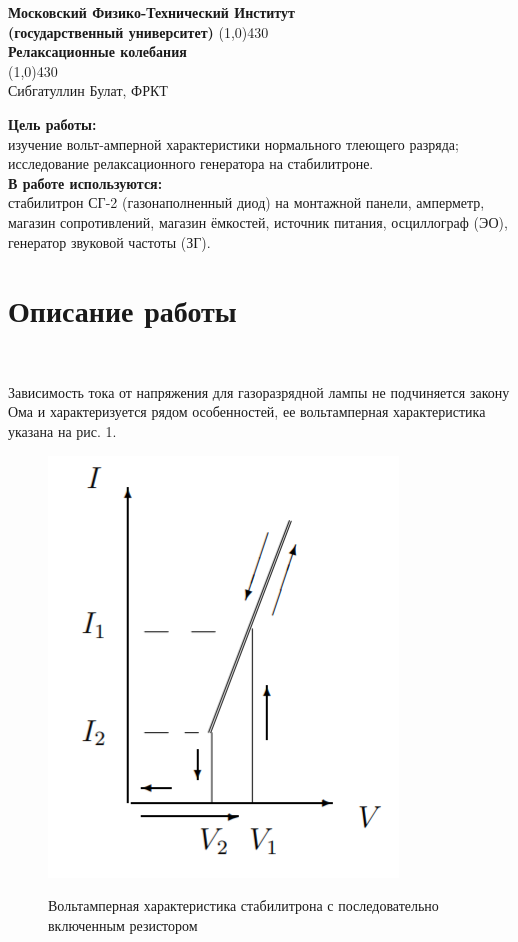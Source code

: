 \documentclass[11pt]{article}
\begin{document}
\begin{titlepage}

\begin{center}
\large\textbf{Московский Физико-Технический Институт}\\
\large\textbf{(государственный университет)}
\vfill
\line(1,0){430}\\[1mm]
\huge\textbf{Релаксационные колебания}\\
\line(1,0){430}\\[1mm]
\vfill
\large Сибгатуллин Булат, ФРКТ\\
\end{center}

\end{titlepage}
\noindent \textbf{Цель работы:} \\
\indent изучение вольт-амперной характеристики нормального тлеющего разряда; исследование релаксационного генератора на стабилитроне.\\
\noindent \textbf{В работе используются:} \\
\indent стабилитрон СГ-2 (газонаполненный диод) на монтажной панели, амперметр, магазин сопротивлений, магазин ёмкостей, источник питания, осциллограф (ЭО), генератор звуковой частоты (ЗГ).
\section*{Описание работы}\

Зависимость тока от напряжения для газоразрядной лампы не подчиняется закону Ома и характеризуется рядом особенностей, ее вольтамперная характеристика указана на рис. 1.

\begin{figure}[h!]
\centering
\includegraphics[scale=0.8]{Image1.png}
\label{fig:Image1}
\caption{Вольтамперная характеристика стабилитрона с последовательно включенным резистором}
\end{figure}
\end{document}
